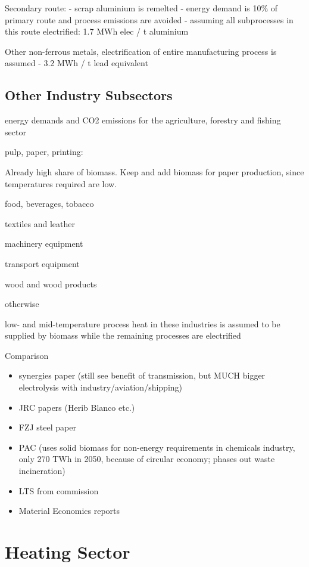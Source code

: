 Secondary route:
- scrap aluminium is remelted
- energy demand is 10\% of primary route and process emissions are avoided
- assuming all subprocesses in this route electrified: 1.7 MWh elec / t aluminium

Other non-ferrous metals, electrification of entire manufacturing process is assumed
- 3.2 MWh / t lead equivalent

\subsection{Other Industry Subsectors}

energy demands and CO2 emissions for the agriculture, forestry and fishing
sector

pulp, paper, printing:

Already high share of biomass. Keep and add biomass for paper production, since
temperatures required are low.

food, beverages, tobacco

textiles and leather

machinery equipment


transport equipment

wood and wood products

otherwise

low- and mid-temperature process heat in these industries is assumed to be supplied by biomass
while the remaining processes are electrified

Comparison

\begin{itemize}
    \item synergies paper (still see benefit of transmission, but MUCH bigger electrolysis with industry/aviation/shipping)
    \item JRC papers (Herib Blanco etc.)
    \item FZJ steel paper
    \item PAC (uses solid biomass for non-energy requirements in chemicals industry, only 270 TWh in 2050, because of circular economy; phases out waste incineration)
    \item LTS from commission 
    \item Material Economics reports 
\end{itemize}

\section{Heating Sector}

